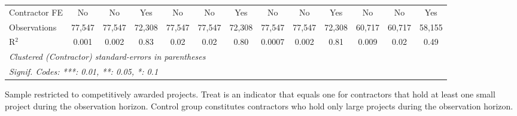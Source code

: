 \documentclass[
]{article}
\begin{document}
\begin{table}[htbp]
\begin{tabular}{lcccccccccccc}
      Contractor FE                & No           & No           & Yes         & No            & No            & Yes           & No           & No     & Yes    & No            & No           & Yes\\  
      Observations                 & 77,547       & 77,547       & 72,308      & 77,547        & 77,547        & 72,308        & 77,547       & 77,547 & 72,308 & 60,717        & 60,717       & 58,155\\  
      R$^2$                        & 0.001        & 0.002        & 0.83        & 0.02          & 0.02          & 0.80          & 0.0007       & 0.002  & 0.81   & 0.009         & 0.02         & 0.49\\  
      \midrule
      \multicolumn{13}{l}{\emph{Clustered (Contractor) standard-errors in parentheses}}\\
      \multicolumn{13}{l}{\emph{Signif. Codes: ***: 0.01, **: 0.05, *: 0.1}}\\
   \end{tabular}
   
   \par \raggedright 
   Sample restricted to competitively awarded projects. Treat is an indicator that equals one for contractors that hold at least one small project during the observation horizon. Control group constitutes contractors who hold only large projects during the observation horizon.
\end{table}
\end{document}
